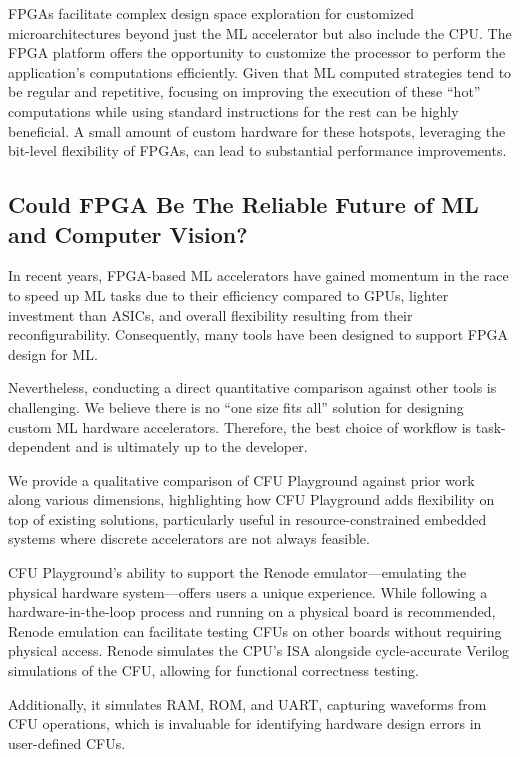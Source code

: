 \documentclass{article}
\begin{document}
FPGAs facilitate complex design space exploration for customized microarchitectures beyond just the ML accelerator but also include the CPU. The FPGA platform offers the opportunity to customize the processor to perform the application’s computations efficiently. Given that ML computed strategies tend to be regular and repetitive, focusing on improving the execution of these “hot” computations while using standard instructions for the rest can be highly beneficial. A small amount of custom hardware for these hotspots, leveraging the bit-level flexibility of FPGAs, can lead to substantial performance improvements.

\subsection{Could FPGA Be The Reliable Future of ML and Computer Vision?}

In recent years, FPGA-based ML accelerators have gained momentum in the race to speed up ML tasks due to their efficiency compared to GPUs, lighter investment than ASICs, and overall flexibility resulting from their reconfigurability. Consequently, many tools have been designed to support FPGA design for ML. 

Nevertheless, conducting a direct quantitative comparison against other tools is challenging. We believe there is no “one size fits all” solution for designing custom ML hardware accelerators. Therefore, the best choice of workflow is task-dependent and is ultimately up to the developer. 

We provide a qualitative comparison of CFU Playground against prior work along various dimensions, highlighting how CFU Playground adds flexibility on top of existing solutions, particularly useful in resource-constrained embedded systems where discrete accelerators are not always feasible.

CFU Playground's ability to support the Renode emulator—emulating the physical hardware system—offers users a unique experience. While following a hardware-in-the-loop process and running on a physical board is recommended, Renode emulation can facilitate testing CFUs on other boards without requiring physical access. Renode simulates the CPU's ISA alongside cycle-accurate Verilog simulations of the CFU, allowing for functional correctness testing.

Additionally, it simulates RAM, ROM, and UART, capturing waveforms from CFU operations, which is invaluable for identifying hardware design errors in user-defined CFUs.
\end{document}
